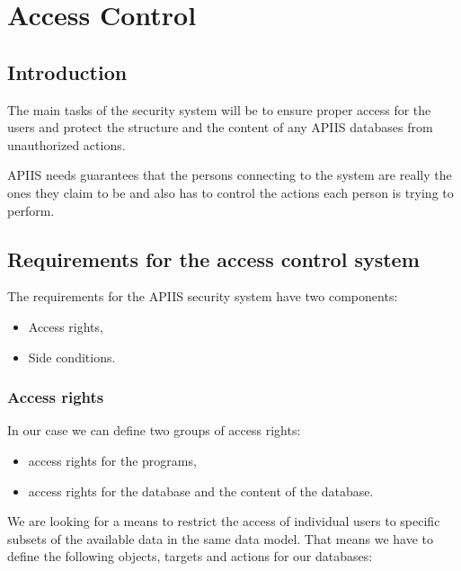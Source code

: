\chapter{Access Control}

\section{Introduction}

The main tasks of the security system will be to ensure proper access
for the users and protect the structure and the content of any APIIS
databases from unauthorized actions. 

APIIS needs guarantees that the persons connecting to the system
are really the ones they claim to be and also has to control the actions
each person is trying to perform. 


\section{Requirements for the access control system }

The requirements for the APIIS security system have two components: 

\begin{itemize}
\item Access rights, 
\item Side conditions. 
\end{itemize}

\subsection{Access rights }

In our case we can define two groups of access rights: 

\begin{itemize}
\item access rights for the programs, 
\item access rights for the database and the content of the database. 
\end{itemize}
We are looking for a means to restrict the access of individual users
to specific subsets of the available data in the same data model.
That means we have to define the following objects, targets and actions
for our databases: 

